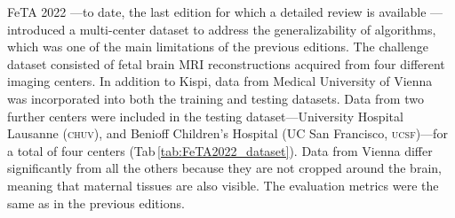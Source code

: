 FeTA 2022 \cite{FeTA2022}---to date, the last edition for which a detailed review is available \cite{FeTA2022_review}---introduced a multi-center dataset to address the generalizability of algorithms, which was one of the main limitations of the previous editions. The challenge dataset consisted of fetal brain MRI reconstructions acquired from four different imaging centers. In addition to Kispi, data from Medical University of Vienna was incorporated into both the training and testing datasets. Data from two further centers were included in the testing dataset---University Hospital Lausanne (\textsc{chuv}), and Benioff Children’s Hospital (UC San Francisco, \textsc{ucsf})---for a total of four centers (Tab\,\ref{tab:FeTA2022_dataset}). Data from Vienna differ significantly from all the others because they are not cropped around the brain, meaning that maternal tissues are also visible. The evaluation metrics were the same as in the previous editions.

